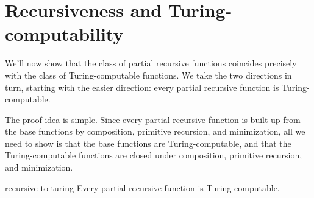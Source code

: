 
\section{Recursiveness and Turing-computability}

We'll now show that the class of partial recursive functions coincides precisely with
the class of Turing-computable functions.
We take the two directions in turn,
starting with the easier direction:
every partial recursive function is Turing-computable.

The proof idea is simple.
Since every partial recursive function is built up from the base functions
by composition, primitive recursion, and minimization,
all we need to show is that
the base functions are Turing-computable,
and that the Turing-computable functions are closed under
composition, primitive recursion, and minimization.

\begin{theorem}{}{recursive-to-turing}
  Every partial recursive function is Turing-computable.
\end{theorem}


